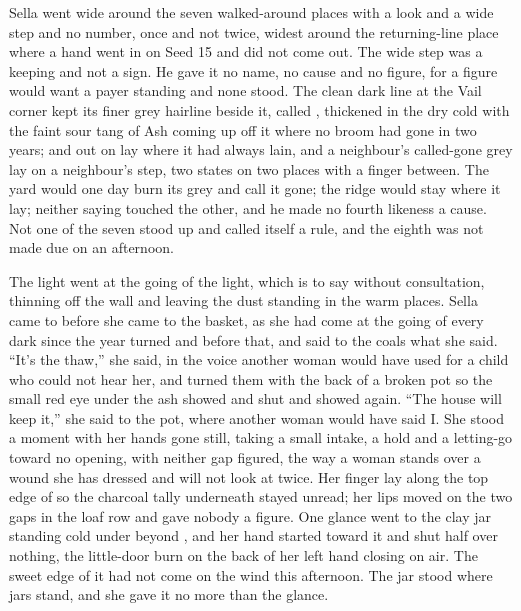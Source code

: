 Sella went wide around the seven walked-around places with a look and a wide step and no number, once and not twice, widest around the returning-line place where a hand went in on Seed 15 and did not come out. The wide step was a keeping and not a sign. He gave it no name, no cause and no figure, for a figure would want a payer standing and none stood. The clean dark line at the Vail corner kept its finer grey hairline beside it, called , thickened in the dry cold with the faint sour tang of Ash coming up off it where no broom had gone in two years; and out on   lay where it had always lain, and a neighbour's called-gone grey lay on a neighbour's step, two states on two places with a finger between. The yard would one day burn its grey and call it gone; the ridge would stay where it lay; neither saying touched the other, and he made no fourth likeness a cause. Not one of the seven stood up and called itself a rule, and the eighth was not made due on an afternoon.

\scenebreak

The light went at the going of the light, which is to say without consultation, thinning off the wall and leaving the dust standing in the warm places. Sella came to  before she came to the basket, as she had come at the going of every dark since the year turned and before that, and said to the coals what she said. “It's the thaw,” she said, in the voice another woman would have used for a child who could not hear her, and turned them with the back of a broken pot so the small red eye under the ash showed and shut and showed again. “The house will keep it,” she said to the pot, where another woman would have said I. She stood a moment with her hands gone still, taking a small intake, a hold and a letting-go toward no opening, with neither gap figured, the way a woman stands over a wound she has dressed and will not look at twice. Her finger lay along the top edge of  so the charcoal tally underneath stayed unread; her lips moved on the two gaps in the loaf row and gave nobody a figure. One glance went to the clay jar standing cold under  beyond , and her hand started toward it and shut half over nothing, the little-door burn on the back of her left hand closing on air. The sweet edge of it had not come on the wind this afternoon. The jar stood where jars stand, and she gave it no more than the glance.

